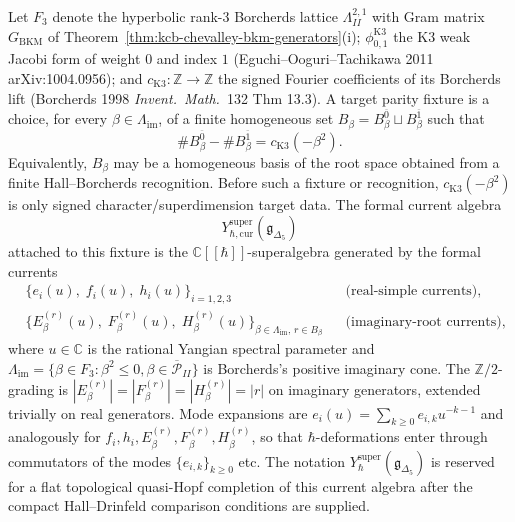 \begin{definition}
\label{def:kcb-super-yangian}
Let $F_3$ denote the hyperbolic rank-$3$ Borcherds lattice
$\Lambda^{2,1}_{II}$ with Gram matrix $G_{\mathrm{BKM}}$ of
Theorem~\ref{thm:kcb-chevalley-bkm-generators}\textup{(i);}
$\phi_{0,1}^{\mathrm{K3}}$ the K3 weak Jacobi form of weight $0$ and index
$1$ (Eguchi--Ooguri--Tachikawa 2011 \textup{arXiv:1004.0956}); and
$c_{\mathrm{K3}}:\mathbb{Z}\to\mathbb{Z}$ the signed Fourier coefficients
of its Borcherds lift (Borcherds 1998 \emph{Invent.~Math.}~132
Thm 13.3). A target parity fixture is a choice, for every
$\beta\in\Lambda_{\mathrm{im}}$, of a finite homogeneous set
$B_\beta=B_\beta^{\overline{0}}\sqcup B_\beta^{\overline{1}}$ such that
\[
 \#B_\beta^{\overline{0}}-\#B_\beta^{\overline{1}}
 =
 c_{\mathrm{K3}}(-\beta^2).
\]
Equivalently, $B_\beta$ may be a homogeneous basis of the root space
obtained from a finite Hall--Borcherds recognition. Before such a fixture
or recognition, $c_{\mathrm{K3}}(-\beta^2)$ is only signed
character/superdimension target data. The formal current algebra
\[
 Y_{\hbar,\mathrm{cur}}^{\mathrm{super}}(\mathfrak{g}_{\Delta_5})
\]
attached to this fixture is the
$\mathbb{C}[[\hbar]]$-superalgebra generated by the formal currents
\begin{align*}
&\bigl\{e_i(u),\; f_i(u),\; h_i(u)\bigr\}_{i=1,2,3} & &
\text{(real-simple currents),}\\[2pt]
&\bigl\{E_\beta^{(r)}(u),\; F_\beta^{(r)}(u),\;
 H_\beta^{(r)}(u)\bigr\}_{\beta\in\Lambda_{\mathrm{im}},\,
 r\in B_\beta} & &
\text{(imaginary-root currents),}
\end{align*}
where $u\in\mathbb{C}$ is the rational Yangian spectral parameter
and $\Lambda_{\mathrm{im}}=\{\beta\in F_3:\beta^2\leq 0,\beta\in
\overline{\mathcal P}_{II}\}$ is Borcherds's positive imaginary cone. The
$\mathbb{Z}/2$-grading is
$|E_\beta^{(r)}|=|F_\beta^{(r)}|=|H_\beta^{(r)}|=|r|$ on imaginary
generators, extended trivially on real generators. Mode expansions are
$e_i(u)=\sum_{k\geq 0}e_{i,k}u^{-k-1}$ and analogously
for $f_i,h_i,E^{(r)}_\beta,F^{(r)}_\beta,H^{(r)}_\beta$, so that
$\hbar$-deformations enter through commutators of the modes
$\{e_{i,k}\}_{k\geq 0}$ etc. The notation
$Y_\hbar^{\mathrm{super}}(\mathfrak{g}_{\Delta_5})$ is reserved for a
flat topological quasi-Hopf completion of this current algebra after the
compact Hall--Drinfeld comparison conditions are supplied.
\end{definition}


